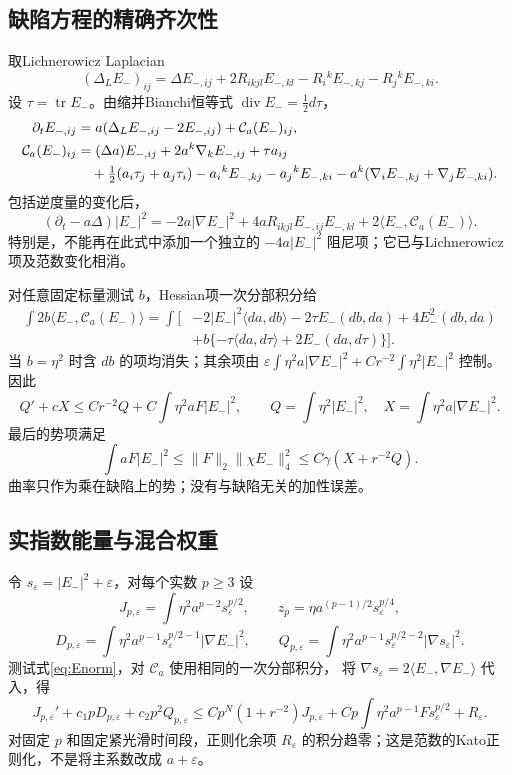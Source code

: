 \documentclass[UTF8,a4paper,11pt,fontset=fandol]{ctexart}
\numberwithin{equation}{section}
\theoremstyle{definition}
\newcommand{\tr}{\operatorname{tr}}
\begin{document}
\subsection{缺陷方程的精确齐次性}
取Lichnerowicz Laplacian
\[
(\Delta_LE_-)_{ij}=\Delta E_{-,ij}
+2R_{ikjl}E_{-,kl}-R_i{}^kE_{-,kj}-R_j{}^kE_{-,ki}.
\]
设 $\tau=\tr E_-$。由缩并Bianchi恒等式 $\operatorname{div}E_-=\tfrac12d\tau$，
\begin{align}
\partial_tE_{-,ij}&=a(\Delta_LE_{-,ij}-2E_{-,ij})+\mathcal C_a(E_-)_{ij},\\
\mathcal C_a(E_-)_{ij}
&=(\Delta a)E_{-,ij}+2a^k\nabla_kE_{-,ij}+\tau a_{ij}\notag\\
&\quad+\tfrac12(a_i\tau_j+a_j\tau_i)
-a_i{}^kE_{-,kj}-a_j{}^kE_{-,ki}
-a^k(\nabla_iE_{-,kj}+\nabla_jE_{-,ki}).\notag
\end{align}
包括逆度量的变化后，
\begin{equation}\label{eq:Enorm}
(\partial_t-a\Delta)|E_-|^2
=-2a|\nabla E_-|^2+4aR_{ikjl}E_{-,ij}E_{-,kl}
+2\langle E_-,\mathcal C_a(E_-)\rangle .
\end{equation}
特别是，不能再在此式中添加一个独立的 $-4a|E_-|^2$ 阻尼项；它已与Lichnerowicz项及范数变化相消。

对任意固定标量测试 $b$，Hessian项一次分部积分给
\begin{align*}
\int2b\langle E_-,\mathcal C_a(E_-)\rangle
=\int\bigl[&
-2|E_-|^2\langle da,db\rangle
-2\tau E_-(db,da)+4E_-^2(db,da)\\
&+b\{-\tau\langle da,d\tau\rangle+2E_-(da,d\tau)\}\bigr].
\end{align*}
当 $b=\eta^2$ 时含 $db$ 的项均消失；其余项由
$\varepsilon\int\eta^2a|\nabla E_-|^2+Cr^{-2}\int\eta^2|E_-|^2$
控制。因此
\begin{equation}\label{eq:Qenergy}
Q'+cX\le Cr^{-2}Q+C\int\eta^2aF|E_-|^2,\qquad
Q=\int\eta^2|E_-|^2,\quad X=\int\eta^2a|\nabla E_-|^2.
\end{equation}
最后的势项满足
\[
\int aF|E_-|^2
\le\|F\|_2\|\chi E_-\|_4^2
\le C\gamma(X+r^{-2}Q).
\]
曲率只作为乘在缺陷上的势；没有与缺陷无关的加性误差。

\subsection{实指数能量与混合权重}
令 $s_\varepsilon=|E_-|^2+\varepsilon$，对每个实数 $p\ge3$ 设
\[
J_{p,\varepsilon}=\int\eta^2a^{p-2}s_\varepsilon^{p/2},\qquad
z_p=\eta a^{(p-1)/2}s_\varepsilon^{p/4},
\]
\[
D_{p,\varepsilon}=\int\eta^2a^{p-1}s_\varepsilon^{p/2-1}|\nabla E_-|^2,\qquad
Q_{p,\varepsilon}=\int\eta^2a^{p-1}s_\varepsilon^{p/2-2}|\nabla s_\varepsilon|^2.
\]
测试式\eqref{eq:Enorm}，对 $\mathcal C_a$ 使用相同的一次分部积分，
将 $\nabla s_\varepsilon=2\langle E_-,\nabla E_-\rangle$ 代入，得
\[
J_{p,\varepsilon}'+c_1pD_{p,\varepsilon}+c_2p^2Q_{p,\varepsilon}
\le Cp^N(1+r^{-2})J_{p,\varepsilon}
+Cp\int\eta^2a^{p-1}F s_\varepsilon^{p/2}+R_\varepsilon.
\]
对固定 $p$ 和固定紧光滑时间段，正则化余项 $R_\varepsilon$ 的积分趋零；这是范数的Kato正则化，不是将主系数改成 $a+\varepsilon$。
\end{document}
